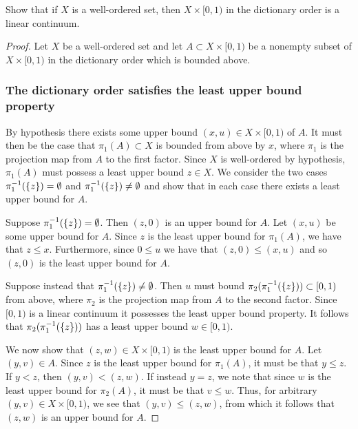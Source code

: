 \begin{exercise}[ID=3.24.6]
  Show that if $X$ is a well-ordered set, then $X \times [0, 1)$ in the dictionary order is a linear continuum.
\end{exercise}
%
\begin{solution}
  \begin{proof}
    Let $X$ be a well-ordered set and let $A \subset X \times [0, 1)$ be a nonempty subset of $X \times [0, 1)$ in the dictionary order which is bounded above.

    \subsubsection*{The dictionary order satisfies the least upper bound property}
    By hypothesis there exists some upper bound $(x, u) \in X \times [0, 1)$ of $A$.
    It must then be the case that $\pi_1(A) \subset X$ is bounded from above by $x$, where $\pi_1$ is the projection map from $A$ to the first factor.
    Since $X$ is well-ordered by hypothesis, $\pi_1(A)$ must possess a least upper bound $z \in X$.
    We consider the two cases $\pi_1^{-1}(\{z\}) = \emptyset$ and $\pi_1^{-1}(\{z\}) \neq \emptyset$ and show that in each case there exists a least upper bound for $A$.
    
    Suppose $\pi_1^{-1}(\{z\}) = \emptyset$.
    Then $(z, 0)$ is an upper bound for $A$.
    Let $(x, u)$ be some upper bound for $A$.
    Since $z$ is the least upper bound for $\pi_1(A)$, we have that $z \leq x$.
    Furthermore, since $0 \leq u$ we have that $(z, 0) \leq (x, u)$ and so $(z, 0)$ is the least upper bound for $A$.

    Suppose instead that $\pi_1^{-1}(\{z\}) \neq \emptyset$.
    Then $u$ must bound $\pi_2(\pi_1^{-1}(\{z\})) \subset [0, 1)$ from above, where $\pi_2$ is the projection map from $A$ to the second factor.
    Since $[0, 1)$ is a linear continuum it possesses the least upper bound property.
    It follows that $\pi_2(\pi_1^{-1}(\{z\}))$ has a least upper bound $w \in [0, 1)$.

    We now show that $(z, w) \in X \times [0, 1)$ is the least upper bound for $A$.
    Let $(y, v) \in A$.
    Since $z$ is the least upper bound for $\pi_1(A)$, it must be that $y \leq z$.
    If $y < z$, then $(y, v) < (z, w)$.
    If instead $y = z$, we note that since $w$ is the least upper bound for $\pi_2(A)$, it must be that $v \leq w$.
    Thus, for arbitrary $(y, v) \in X \times [0, 1)$, we see that $(y, v) \leq (z, w)$, from which it follows that $(z, w)$ is an upper bound for $A$.


\end{proof}
\end{solution}
